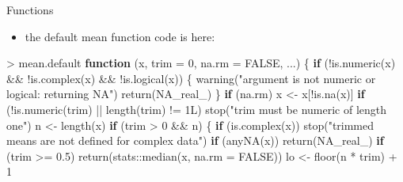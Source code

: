 \documentclass[
  ignorenonframetext,
]{beamer}
\newenvironment{Shaded}{\begin{snugshade}}{\end{snugshade}}
\newcommand{\AttributeTok}[1]{\textcolor[rgb]{0.77,0.63,0.00}{#1}}
\newcommand{\ConstantTok}[1]{\textcolor[rgb]{0.00,0.00,0.00}{#1}}
\newcommand{\ControlFlowTok}[1]{\textcolor[rgb]{0.13,0.29,0.53}{\textbf{#1}}}
\newcommand{\DecValTok}[1]{\textcolor[rgb]{0.00,0.00,0.81}{#1}}
\newcommand{\FloatTok}[1]{\textcolor[rgb]{0.00,0.00,0.81}{#1}}
\newcommand{\FunctionTok}[1]{\textcolor[rgb]{0.00,0.00,0.00}{#1}}
\newcommand{\NormalTok}[1]{#1}
\newcommand{\OtherTok}[1]{\textcolor[rgb]{0.56,0.35,0.01}{#1}}
\newcommand{\SpecialCharTok}[1]{\textcolor[rgb]{0.00,0.00,0.00}{#1}}
\newcommand{\StringTok}[1]{\textcolor[rgb]{0.31,0.60,0.02}{#1}}
\providecommand{\tightlist}{%
  \setlength{\itemsep}{0pt}\setlength{\parskip}{0pt}}
\begin{document}
\begin{frame}[fragile]{Functions}
\protect\hypertarget{functions-1}{}
\begin{itemize}[<+->]
\tightlist
\item
  the default mean function code is here:
\end{itemize}

\begin{Shaded}
\begin{Highlighting}[]
\SpecialCharTok{\textgreater{}}\NormalTok{ mean.default}
\ControlFlowTok{function}\NormalTok{ (x, }\AttributeTok{trim =} \DecValTok{0}\NormalTok{, }\AttributeTok{na.rm =} \ConstantTok{FALSE}\NormalTok{, ...) }
\NormalTok{\{}
    \ControlFlowTok{if}\NormalTok{ (}\SpecialCharTok{!}\FunctionTok{is.numeric}\NormalTok{(x) }\SpecialCharTok{\&\&} \SpecialCharTok{!}\FunctionTok{is.complex}\NormalTok{(x) }\SpecialCharTok{\&\&} \SpecialCharTok{!}\FunctionTok{is.logical}\NormalTok{(x)) \{}
        \FunctionTok{warning}\NormalTok{(}\StringTok{"argument is not numeric or logical: returning NA"}\NormalTok{)}
        \FunctionTok{return}\NormalTok{(}\ConstantTok{NA\_real\_}\NormalTok{)}
\NormalTok{    \}}
    \ControlFlowTok{if}\NormalTok{ (na.rm) }
\NormalTok{        x }\OtherTok{\textless{}{-}}\NormalTok{ x[}\SpecialCharTok{!}\FunctionTok{is.na}\NormalTok{(x)]}
    \ControlFlowTok{if}\NormalTok{ (}\SpecialCharTok{!}\FunctionTok{is.numeric}\NormalTok{(trim) }\SpecialCharTok{||} \FunctionTok{length}\NormalTok{(trim) }\SpecialCharTok{!=}\NormalTok{ 1L) }
        \FunctionTok{stop}\NormalTok{(}\StringTok{"\textquotesingle{}trim\textquotesingle{} must be numeric of length one"}\NormalTok{)}
\NormalTok{    n }\OtherTok{\textless{}{-}} \FunctionTok{length}\NormalTok{(x)}
    \ControlFlowTok{if}\NormalTok{ (trim }\SpecialCharTok{\textgreater{}} \DecValTok{0} \SpecialCharTok{\&\&}\NormalTok{ n) \{}
        \ControlFlowTok{if}\NormalTok{ (}\FunctionTok{is.complex}\NormalTok{(x)) }
            \FunctionTok{stop}\NormalTok{(}\StringTok{"trimmed means are not defined for complex data"}\NormalTok{)}
        \ControlFlowTok{if}\NormalTok{ (}\FunctionTok{anyNA}\NormalTok{(x)) }
            \FunctionTok{return}\NormalTok{(}\ConstantTok{NA\_real\_}\NormalTok{)}
        \ControlFlowTok{if}\NormalTok{ (trim }\SpecialCharTok{\textgreater{}=} \FloatTok{0.5}\NormalTok{) }
            \FunctionTok{return}\NormalTok{(stats}\SpecialCharTok{::}\FunctionTok{median}\NormalTok{(x, }\AttributeTok{na.rm =} \ConstantTok{FALSE}\NormalTok{))}
\NormalTok{        lo }\OtherTok{\textless{}{-}} \FunctionTok{floor}\NormalTok{(n }\SpecialCharTok{*}\NormalTok{ trim) }\SpecialCharTok{+} \DecValTok{1}

\end{Highlighting}
\end{Shaded}
\end{frame}
\end{document}
